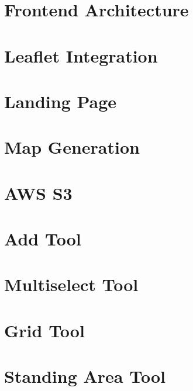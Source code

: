 \section{Frontend Architecture}


\section{Leaflet Integration}


\newpage

\section{Landing Page}


\section{Map Generation}


\section{AWS S3}


\section{Add Tool}


\section{Multiselect Tool}


\section{Grid Tool}
\label{sec:grid-tool}


\section{Standing Area Tool}


